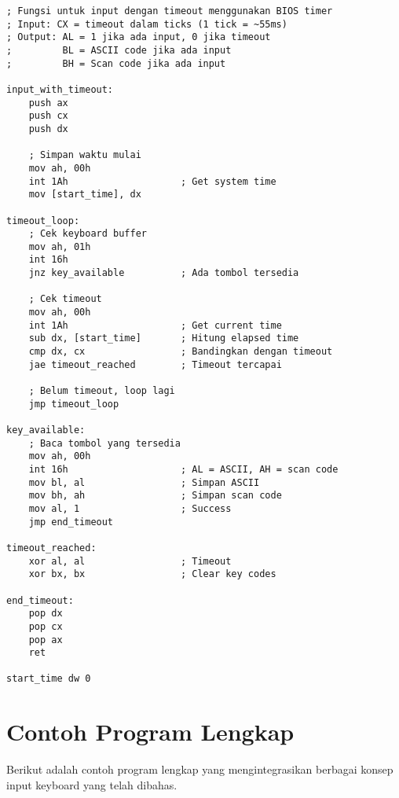 \documentclass[../main.tex]{subfiles}
\begin{document}
\begin{lstlisting}[language={[x86masm]Assembler}, caption=Input dengan Timeout menggunakan Timer, label={lst:timeout-timer}]
; Fungsi untuk input dengan timeout menggunakan BIOS timer
; Input: CX = timeout dalam ticks (1 tick = ~55ms)
; Output: AL = 1 jika ada input, 0 jika timeout
;         BL = ASCII code jika ada input
;         BH = Scan code jika ada input

input_with_timeout:
    push ax
    push cx
    push dx
    
    ; Simpan waktu mulai
    mov ah, 00h
    int 1Ah                    ; Get system time
    mov [start_time], dx
    
timeout_loop:
    ; Cek keyboard buffer
    mov ah, 01h
    int 16h
    jnz key_available          ; Ada tombol tersedia
    
    ; Cek timeout
    mov ah, 00h
    int 1Ah                    ; Get current time
    sub dx, [start_time]       ; Hitung elapsed time
    cmp dx, cx                 ; Bandingkan dengan timeout
    jae timeout_reached        ; Timeout tercapai
    
    ; Belum timeout, loop lagi
    jmp timeout_loop
    
key_available:
    ; Baca tombol yang tersedia
    mov ah, 00h
    int 16h                    ; AL = ASCII, AH = scan code
    mov bl, al                 ; Simpan ASCII
    mov bh, ah                 ; Simpan scan code
    mov al, 1                  ; Success
    jmp end_timeout
    
timeout_reached:
    xor al, al                 ; Timeout
    xor bx, bx                 ; Clear key codes
    
end_timeout:
    pop dx
    pop cx
    pop ax
    ret
    
start_time dw 0
\end{lstlisting}

    \section{Contoh Program Lengkap}
        Berikut adalah contoh program lengkap yang mengintegrasikan berbagai konsep input keyboard yang telah dibahas.
\end{document}
